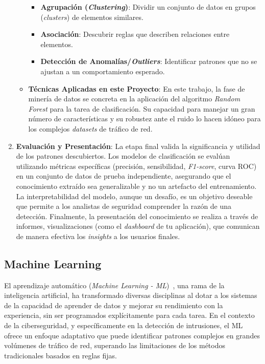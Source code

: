 \begin{enumerate}
\begin{itemize}
\begin{itemize}
            \item\textbf{Agrupación (\textit{Clustering})}: Dividir un conjunto de datos en grupos (\textit{clusters}) de elementos similares.
            
            \item\textbf{Asociación}: Descubrir reglas que describen relaciones entre elementos.
            
            \item\textbf{Detección de Anomalías/\textit{Outliers}}: Identificar patrones que no se ajustan a un comportamiento esperado.
              
        \end{itemize}
    \item\textbf{Técnicas Aplicadas en este Proyecto}: En este trabajo, la fase de minería de datos se concreta en la aplicación del algoritmo \textit{Random Forest} para la tarea de clasificación. Su capacidad para manejar un gran número de características y su robustez ante el ruido lo hacen idóneo para los complejos \textit{datasets} de tráfico de red.
    \end{itemize}
    
    \item\textbf{Evaluación y Presentación}: La etapa final valida la significancia y utilidad de los patrones descubiertos. Los modelos de clasificación se evalúan utilizando métricas específicas (precisión, sensibilidad, \textit{F1-score}, curva ROC) en un conjunto de datos de prueba independiente, asegurando que el conocimiento extraído sea generalizable y no un artefacto del entrenamiento. La interpretabilidad del modelo, aunque un desafío, es un objetivo deseable que permite a los analistas de seguridad comprender la razón de una detección. Finalmente, la presentación del conocimiento se realiza a través de informes, visualizaciones (como el \textit{dashboard} de tu aplicación), que comunican de manera efectiva los \textit{insights} a los usuarios finales.

\end{enumerate}
\subsection{Machine Learning}

El aprendizaje automático (\textit{Machine Learning - ML})~\cite{bishop2007prml}, una rama de la inteligencia artificial, ha transformado diversas disciplinas al dotar a los sistemas de la capacidad de aprender de datos y mejorar su rendimiento con la experiencia, sin ser programados explícitamente para cada tarea. En el contexto de la ciberseguridad, y específicamente en la detección de intrusiones, el ML ofrece un enfoque adaptativo que puede identificar patrones complejos en grandes volúmenes de tráfico de red, superando las limitaciones de los métodos tradicionales basados en reglas fijas.

